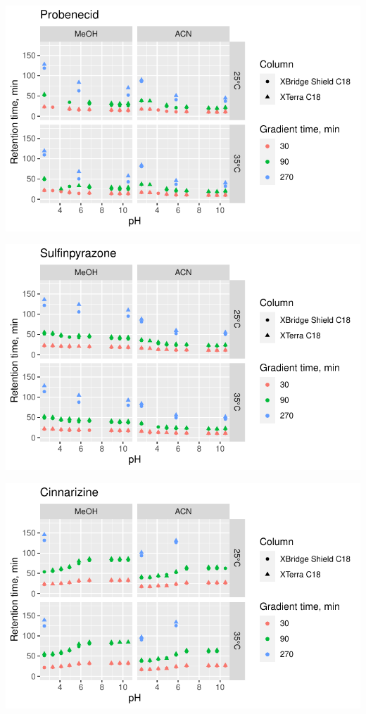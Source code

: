 \documentclass[
  letterpaper,
  DIV=11,
  numbers=noendperiod]{scrreprt}
\begin{document}
\includegraphics{index_files/figure-pdf/unnamed-chunk-4-75.pdf}

\includegraphics{index_files/figure-pdf/unnamed-chunk-4-76.pdf}

\includegraphics{index_files/figure-pdf/unnamed-chunk-4-77.pdf}
\end{document}
